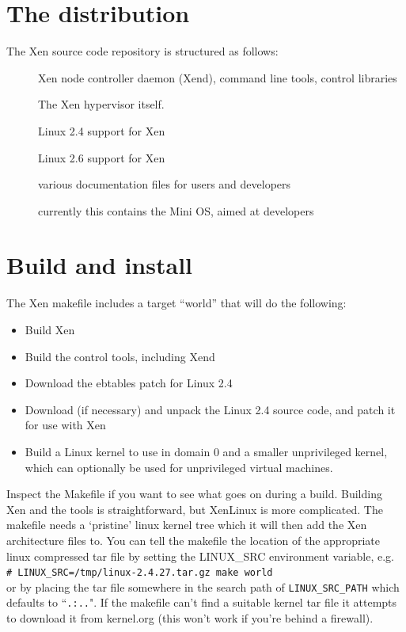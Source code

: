 \documentclass[11pt,twoside,final,openright]{xenstyle}
\begin{document}
\section{The distribution}

The Xen source code repository is structured as follows:

\begin{description}
\item[] Xen node controller daemon (Xend), command line tools, 
  control libraries
\item[] The Xen hypervisor itself.
\item[] Linux 2.4 support for Xen
\item[] Linux 2.6 support for Xen
\item[] various documentation files for users and developers
\item[] currently this contains the Mini OS, aimed at developers
\end{description}

\section{Build and install}

The Xen makefile includes a target ``world'' that will do the
following:

\begin{itemize}
\item Build Xen
\item Build the control tools, including Xend
\item Download the ebtables patch for Linux 2.4
\item Download (if necessary) and unpack the Linux 2.4 source code,
      and patch it for use with Xen
\item Build a Linux kernel to use in domain 0 and a smaller
      unprivileged kernel, which can optionally be used for
      unprivileged virtual machines.
\end{itemize}

Inspect the Makefile if you want to see what goes on during a
build. Building Xen and the tools is straightforward, but XenLinux is
more complicated. The makefile needs a `pristine' linux kernel tree
which it will then add the Xen architecture files to. You can tell the
makefile the location of the appropriate linux compressed tar file by
setting the LINUX\_SRC environment variable, e.g. \\
\verb!# LINUX_SRC=/tmp/linux-2.4.27.tar.gz make world! \\ or by
placing the tar file somewhere in the search path of {\tt LINUX\_SRC\_PATH}
which defaults to ``{\tt .:..}". If the makefile can't find a suitable
kernel tar file it attempts to download it from kernel.org (this won't
work if you're behind a firewall).
\end{document}
